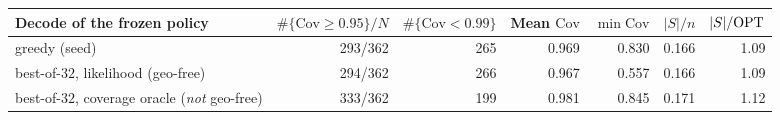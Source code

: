 \begin{tabular}{lrrrrrr}
  \toprule
  Decode of the frozen policy & $\#\{\mathrm{Cov}\ge 0.95\}/N$ & $\#\{\mathrm{Cov}<0.99\}$ & Mean $\mathrm{Cov}$ & $\min\mathrm{Cov}$ & $|S|/n$ & $|S|/\mathrm{OPT}$ \\
  \midrule
  greedy (seed) & 293/362 & 265 & 0.969 & 0.830 & 0.166 & 1.09 \\
  best-of-$32$, likelihood (geo-free) & 294/362 & 266 & 0.967 & 0.557 & 0.166 & 1.09 \\
  best-of-$32$, coverage oracle (\emph{not} geo-free) & 333/362 & 199 & 0.981 & 0.845 & 0.171 & 1.12 \\
  \bottomrule
\end{tabular}
